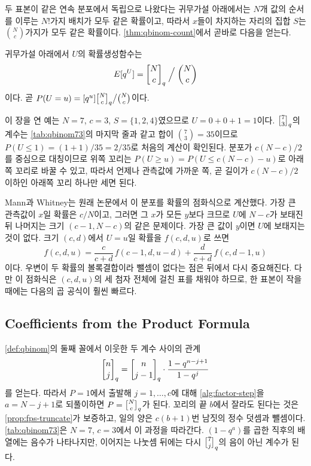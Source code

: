 두 표본이 같은 연속 분포에서 독립으로 나왔다는 귀무가설 아래에서는 $N$개 값의 순서를 이루는 $N!$가지 배치가 모두 같은 확률이고, 따라서 $x$들이 차지하는 자리의 집합 $S$는 $\binom Nc$가지가 모두 같은 확률이다. \cref{thm:qbinom-count}에서 곧바로 다음을 얻는다.

\begin{corollary}
\label{cor:mwu}
귀무가설 아래에서 $U$의 확률생성함수는
\[
E[q^U]=\qbinom Nc\Bigm/\binom Nc
\]
이다. 곧 $P(U=u)=[q^u]\qbinom Nc\big/\binom Nc$이다.
\end{corollary}

이 장을 연 예는 $N=7$, $c=3$, $S=\{1,2,4\}$였으므로 $U=0+0+1=1$이다. $\qbinom73$의 계수는 \cref{tab:qbinom73}의 마지막 줄과 같고 합이 $\binom73=35$이므로 $P(U\le1)=(1+1)/35=2/35$로 처음의 계산이 확인된다. 분포가 $c(N-c)/2$를 중심으로 대칭이므로 위쪽 꼬리는 $P(U\ge u)=P(U\le c(N-c)-u)$로 아래쪽 꼬리로 바꿀 수 있고, 따라서 언제나 관측값에 가까운 쪽, 곧 길이가 $c(N-c)/2$ 이하인 아래쪽 꼬리 하나만 세면 된다.

Mann과 Whitney는 원래 논문에서 이 분포를 확률의 점화식으로 계산했다. 가장 큰 관측값이 $x$일 확률은 $c/N$이고, 그러면 그 $x$가 모든 $y$보다 크므로 $U$에 $N-c$가 보태진 뒤 나머지는 크기 $(c-1,N-c)$의 같은 문제이다. 가장 큰 값이 $y$이면 $U$에 보태지는 것이 없다. 크기 $(c,d)$에서 $U=u$일 확률을 $f(c,d,u)$로 쓰면
\[
f(c,d,u)=\frac c{c+d}\,f(c-1,d,u-d)+\frac d{c+d}\,f(c,d-1,u)
\]
이다\cite{mannwhitney1947}. 우변이 두 확률의 볼록결합이라 뺄셈이 없다는 점은 뒤에서 다시 중요해진다. 다만 이 점화식은 $(c,d,u)$의 세 첨자 전체에 걸친 표를 채워야 하므로, 한 표본이 작을 때에는 다음의 곱 공식이 훨씬 빠르다.

\subsection{Coefficients from the Product Formula}

\cref{def:qbinom}의 둘째 꼴에서 이웃한 두 계수 사이의 관계
\begin{equation}
\label{eq:qbinom-product}
\qbinom nj=\qbinom n{j-1}\cdot\frac{1-q^{n-j+1}}{1-q^j}
\end{equation}
를 얻는다. 따라서 $P=1$에서 출발해 $j=1,\dots,c$에 대해 \cref{alg:factor-step}을 $a=N-j+1$로 되풀이하면 $P=\qbinom Nc$가 된다. 꼬리의 끝 $b$에서 잘라도 된다는 것은 \cref{prop:fps-truncate}가 보증하고, 일의 양은 $c(b+1)$번 남짓의 정수 덧셈과 뺄셈이다. \cref{tab:qbinom73}은 $N=7$, $c=3$에서 이 과정을 따라간다. $(1-q^a)$를 곱한 직후의 배열에는 음수가 나타나지만, 이어지는 나눗셈 뒤에는 다시 $\qbinom7j$의 음이 아닌 계수가 된다.

